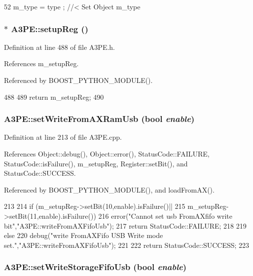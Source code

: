 \begin{DoxyCode}
52 { m_type  = type  ; } //< Set Object m_type
\end{DoxyCode}
\hypertarget{classA3PE_a94d96383e441153ed01e82cc12d2f593}{
\subsubsection[{setupReg}]{$\ast$ A3PE::setupReg ()}}
\label{classA3PE_a94d96383e441153ed01e82cc12d2f593}


Definition at line 488 of file A3PE.h.

References m\_\-setupReg.

Referenced by BOOST\_\-PYTHON\_\-MODULE().


\begin{DoxyCode}
488                       {
489     return m_setupReg;
490   }
\end{DoxyCode}
\hypertarget{classA3PE_aeb276fae7f19c45b4b4a3a5a2b99c337}{
\subsubsection[{setWriteFromAXRamUsb}]{ A3PE::setWriteFromAXRamUsb (bool {\em enable})}}
\label{classA3PE_aeb276fae7f19c45b4b4a3a5a2b99c337}


Definition at line 213 of file A3PE.cpp.

References Object::debug(), Object::error(), StatusCode::FAILURE, StatusCode::isFailure(), m\_\-setupReg, Register::setBit(), and StatusCode::SUCCESS.

Referenced by BOOST\_\-PYTHON\_\-MODULE(), and loadFromAX().


\begin{DoxyCode}
213                                                 {
214   if (m_setupReg->setBit(10,enable).isFailure()||
215       m_setupReg->setBit(11,enable).isFailure()){
216     error("Cannot set usb FromAXfifo write bit","A3PE::writeFromAXFifoUsb");
217     return StatusCode::FAILURE;
218   }
219   else {
220     debug("write FromAXFifo USB Write mode set.","A3PE::writeFromAXFifoUsb");
221   }
222   return StatusCode::SUCCESS;
223 }
\end{DoxyCode}
\hypertarget{classA3PE_aa688f9dff8d2892464fcd13fdf3600ad}{
\subsubsection[{setWriteStorageFifoUsb}]{ A3PE::setWriteStorageFifoUsb (bool {\em enable})}}
\label{classA3PE_aa688f9dff8d2892464fcd13fdf3600ad}


